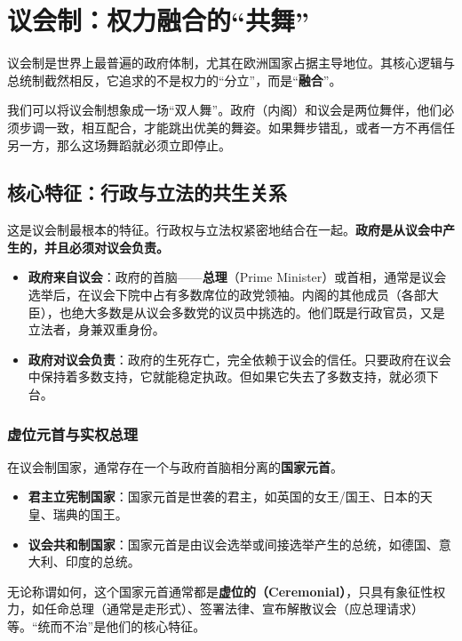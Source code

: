 \hrulefill

\section{议会制：权力融合的“共舞”}

议会制是世界上最普遍的政府体制，尤其在欧洲国家占据主导地位。其核心逻辑与总统制截然相反，它追求的不是权力的“分立”，而是“\textbf{融合}”。

我们可以将议会制想象成一场“双人舞”。政府（内阁）和议会是两位舞伴，他们必须步调一致，相互配合，才能跳出优美的舞姿。如果舞步错乱，或者一方不再信任另一方，那么这场舞蹈就必须立即停止。

\subsection{核心特征：行政与立法的共生关系}

这是议会制最根本的特征。行政权与立法权紧密地结合在一起。\textbf{政府是从议会中产生的，并且必须对议会负责。}

\begin{itemize}
    \item \textbf{政府来自议会}：政府的首脑——\textbf{总理}（Prime Minister）或首相，通常是议会选举后，在议会下院中占有多数席位的政党领袖。内阁的其他成员（各部大臣），也绝大多数是从议会多数党的议员中挑选的。他们既是行政官员，又是立法者，身兼双重身份。
    \item \textbf{政府对议会负责}：政府的生死存亡，完全依赖于议会的信任。只要政府在议会中保持着多数支持，它就能稳定执政。但如果它失去了多数支持，就必须下台。
\end{itemize}

\subsubsection*{虚位元首与实权总理}

在议会制国家，通常存在一个与政府首脑相分离的\textbf{国家元首}。
\begin{itemize}
    \item \textbf{君主立宪制国家}：国家元首是世袭的君主，如英国的女王/国王、日本的天皇、瑞典的国王。
    \item \textbf{议会共和制国家}：国家元首是由议会选举或间接选举产生的总统，如德国、意大利、印度的总统。
\end{itemize}

无论称谓如何，这个国家元首通常都是\textbf{虚位的（Ceremonial）}，只具有象征性权力，如任命总理（通常是走形式）、签署法律、宣布解散议会（应总理请求）等。“统而不治”是他们的核心特征。

